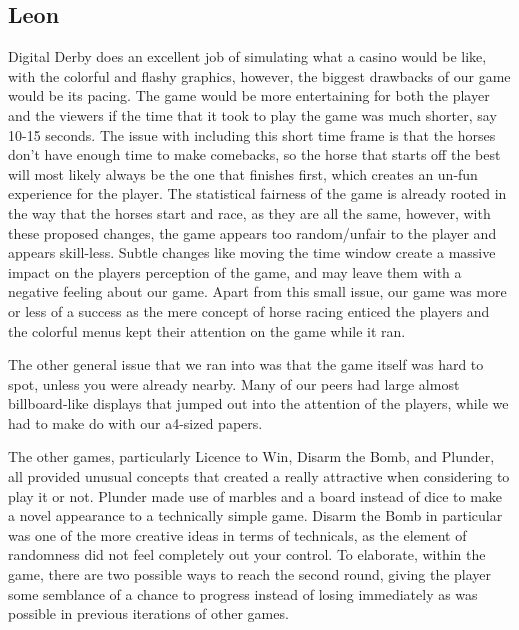 \documentclass{article}
\begin{document}
{{}
\subsection{Leon}
{
Digital Derby does an excellent job of simulating what a casino would be like, with the colorful and flashy graphics, however, the biggest drawbacks of our game would be its pacing. The game would be more entertaining for both the player and the viewers if the time that it took to play the game was much shorter, say 10-15 seconds. The issue with including this short time frame is that the horses don't have enough time to make comebacks, so the horse that starts off the best will most likely always be the one that finishes first, which creates an un-fun experience for the player. The statistical fairness of the game is already rooted in the way that the horses start and race, as they are all the same, however, with these proposed changes, the game appears too random/unfair to the player and appears skill-less. Subtle changes like moving the time window create a massive impact on the players perception of the game, and may leave them with a negative feeling about our game. Apart from this small issue, our game was more or less of a success as the mere concept of horse racing enticed the players and the colorful menus kept their attention on the game while it ran.

\vspace{2ex}

The other general issue that we ran into was that the game itself was hard to spot, unless you were already nearby. Many of our peers had large almost billboard-like displays that jumped out into the attention of the players, while we had to make do with our a4-sized papers. 

\vspace{2ex}

The other games, particularly Licence to Win, Disarm the Bomb, and Plunder, all provided unusual concepts that created a really attractive when considering to play it or not. Plunder made use of marbles and a board instead of dice to make a novel appearance to a technically simple game. Disarm the Bomb in particular was one of the more creative ideas in terms of technicals, as the element of randomness did not feel completely out your control. To elaborate, within the game, there are two possible ways to reach the second round, giving the player some semblance of a chance to progress instead of losing immediately as was possible in previous iterations of other games.

}}
\end{document}
